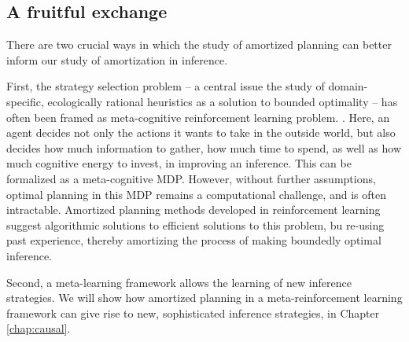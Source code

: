 

\subsection{A fruitful exchange}

There are two crucial ways in which the study of amortized planning can better inform our study of amortization in inference.

First, the strategy selection problem -- a central issue the study of domain-specific, ecologically rational heuristics as a solution to bounded optimality -- has often been framed as meta-cognitive reinforcement learning problem. \cite{erev2005adaptation, rieskamp2006ssl, lieder2017strategy}. Here, an agent decides not only the actions it wants to take in the outside world, but also decides how much information to gather, how much time to spend, as well as how much cognitive energy to invest, in improving an inference. This can be formalized as a meta-cognitive MDP. However, without further assumptions, optimal planning in this MDP remains a computational challenge, and is often intractable. Amortized planning methods developed in reinforcement learning suggest algorithmic solutions to efficient solutions to this problem, bu re-using past experience, thereby amortizing the process of making boundedly optimal inference.

Second, a meta-learning framework allows the learning of new inference strategies. We will show how amortized planning in a meta-reinforcement learning framework can give rise to new, sophisticated inference strategies, in Chapter \ref{chap:causal}.